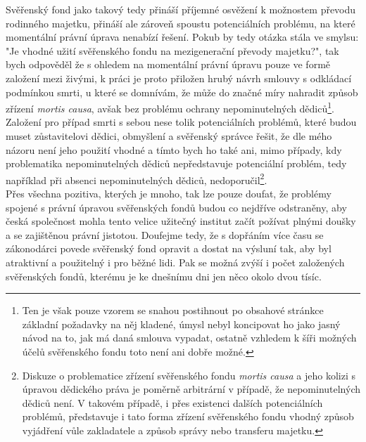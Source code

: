 \documentclass{article}
\begin{document}
Svěřenský fond jako takový tedy přináší příjemné osvěžení k možnostem převodu rodinného majetku, přináší ale zároveň spoustu potenciálních problému, na které momentální právní úprava nenabízí řešení. Pokub by tedy otázka stála ve smylsu: "Je vhodné užití svěřenského fondu na mezigenerační převody majetku?", tak bych odpověděl že s ohledem na momentální právní úpravu pouze ve formě založení mezi živými, k práci je proto přiložen hrubý návrh smlouvy s odkládací podmínkou smrti, u které se domnívám, že může do značné míry nahradit způsob zřízení \textit{mortis causa}, avšak bez problému ochrany nepominutelných dědiců\footnote{Ten je však pouze vzorem se snahou postihnout po obsahové stránkce základní požadavky na něj kladené, úmysl nebyl koncipovat ho jako jasný návod na to, jak má daná smlouva vypadat, ostatně vzhledem k šíři možných účelů svěřenského fondu toto není ani dobře možné.}. Založení pro případ smrti s sebou nese tolik potenciálních problémů, které budou muset zůstavitelovi dědici, obmyšlení a svěřenský správce řešit, že dle mého názoru není jeho použití vhodné a tímto bych ho také ani, mimo případy, kdy problematika nepominutelných dědiců nepředstavuje potenciální problém, tedy například při absenci nepominutelných dědiců, nedoporučil\footnote{Diskuze o problematice zřízení svěřenského fondu \textit{mortis causa} a jeho kolizi s úpravou dědického práva je poměrně arbitrární v případě, že nepominutelných dědiců není. V takovém případě, i přes existenci dalších potenciálních problémů, představuje i tato forma zřízení svěřenského fondu vhodný způsob vyjádření vůle zakladatele a způsob správy nebo transferu majetku.}.\\

Přes všechna pozitiva, kterých je mnoho, tak lze pouze doufat, že problémy spojené s právní úpravou svěřenských fondů budou co nejdříve odstraněny, aby česká společnost mohla tento velice užitečný institut začít požívat plnými doušky a se zajištěnou právní jistotou. Doufejme tedy, že s dopřáním více času se zákonodárci povede svěřenský fond opravit a dostat na výsluní tak, aby byl atraktivní a použitelný i pro běžné lidi. Pak se možná zvýší i počet založených svěřenských fondů, kterému je ke dnešnímu dni jen něco okolo dvou tísíc.\\

\end{document}
